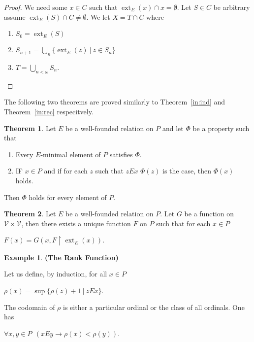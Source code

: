 \documentclass[8pt]{article}
\theoremstyle{definition}
\theoremstyle{definition}
\newtheorem{theorem}{Theorem}[section]
\theoremstyle{definition}
\theoremstyle{definition}
\theoremstyle{definition}
\theoremstyle{definition}
\theoremstyle{definition}
\theoremstyle{definition}
\theoremstyle{definition}
\theoremstyle{definition}
\theoremstyle{definition}
\theoremstyle{definition}
\newtheorem{example}{Example}[section]
\theoremstyle{definition}
\theoremstyle{definition}
\theoremstyle{question}
\begin{document}
\begin{proof}
  We need some $x \in C$ such that $\operatorname{ext}_E(x) \cap x = \emptyset$.
  Let $S \in C$ be arbitrary assume $\operatorname{ext}_E(S) \cap C \neq \emptyset$.
  We let $X = T \cap C$ where
  \begin{enumerate}
    \item $S_0 = \operatorname{ext}_E(S)$ 

    \item $S_{n + 1} = \bigcup \limits_{n} \{ \operatorname{ext}_E(z) \: |\: z \in S_n \}$

    \item $T = \bigcup \limits_{n < \omega} S_n$.
  \end{enumerate}
\end{proof}

The following two theorems are proved similarly to Theorem~\ref{in:ind} and Theorem~\ref{in:rec} respecitvely.

\begin{theorem}
  Let $E$ be a well-founded relation on $P$ and let $\Phi$ be a property such that
  \begin{enumerate}
    \item Every $E$-minimal element of $P$ satisfies $\Phi$.
    \item IF $x \in P$ and if for each $z$ such that $z E x$ $\Phi(z)$ is the case, then $\Phi(x)$ holds.
  \end{enumerate}

  Then $\Phi$ holds for every element of $P$.
\end{theorem}

\begin{theorem}
  Let $E$ be a well-founded relation on $P$. Let $G$ be a function on $\mathcal{V} \times \mathcal{V}$, 
  then there exists a unique function $F$ on $P$ such that for each $x \in P$
  \begin{center}
    $F(x) = G(x, F \upharpoonright \operatorname{ext}_E(x))$.
  \end{center}
\end{theorem}

\begin{example} {\bf (The Rank Function) }

  Let us define, by induction, for all $x \in P$
  \begin{center}
    $\rho(x) = \sup \{ \rho(z) + 1 \: | \: z E x \}$.
  \end{center}
  The codomain of $\rho$ is either a particular ordinal or the class of all ordinals. One has
  \begin{center}
    $\forall x, y \in P \:\: (x E y \to \rho(x) < \rho(y))$.
  \end{center}
\end{example}
\end{document}
